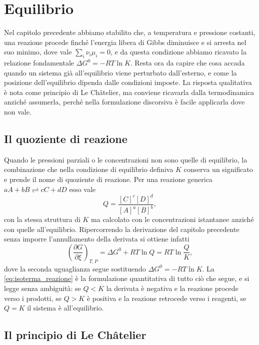 \chapter{Equilibrio}

Nel capitolo precedente abbiamo stabilito che, a temperatura e pressione costanti, una reazione procede finché l'energia libera di Gibbs diminuisce e si arresta nel suo minimo, dove vale $\sum_i \nu_i\mu_i = 0$, e da questa condizione abbiamo ricavato la relazione fondamentale $\Delta G^0 = -RT\ln K$.
Resta ora da capire che cosa accada quando un sistema già all'equilibrio viene perturbato dall'esterno, e come la posizione dell'equilibrio dipenda dalle condizioni imposte.
La risposta qualitativa è nota come principio di Le Châtelier, ma conviene ricavarla dalla termodinamica anziché assumerla, perché nella formulazione discorsiva è facile applicarla dove non vale.

\section{Il quoziente di reazione}

Quando le pressioni parziali o le concentrazioni non sono quelle di equilibrio, la combinazione che nella condizione di equilibrio definiva $K$ conserva un significato e prende il nome di quoziente di reazione.
Per una reazione generica $aA + bB \rightleftharpoons cC + dD$ esso vale
\begin{equation}
    Q = \frac{[C]^{c}[D]^{d}}{[A]^{a}[B]^{b}} ,
    \label{eq:quoziente}
\end{equation}
con la stessa struttura di $K$ ma calcolato con le concentrazioni istantanee anziché con quelle all'equilibrio.
Ripercorrendo la derivazione del capitolo precedente senza imporre l'annullamento della derivata si ottiene infatti
\begin{equation}
    \left(\frac{\partial G}{\partial \xi}\right)_{T,P} = \Delta G^0 + RT\ln Q = RT\ln\frac{Q}{K} ,
    \label{eq:isoterma_reazione}
\end{equation}
dove la seconda uguaglianza segue sostituendo $\Delta G^0 = -RT\ln K$.
La \eqref{eq:isoterma_reazione} è la formulazione quantitativa di tutto ciò che segue, e si legge senza ambiguità: se $Q < K$ la derivata è negativa e la reazione procede verso i prodotti, se $Q > K$ è positiva e la reazione retrocede verso i reagenti, se $Q = K$ il sistema è all'equilibrio.

\section{Il principio di Le Châtelier}

